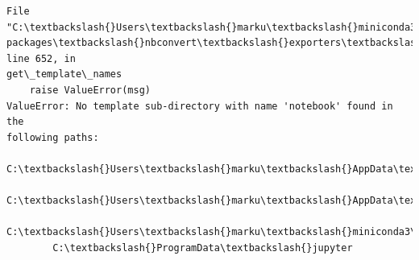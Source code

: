 \documentclass[11pt]{article}
\begin{document}
\begin{Verbatim}[commandchars=\\\{\}]
  File "C:\textbackslash{}Users\textbackslash{}marku\textbackslash{}miniconda3\textbackslash{}Lib\textbackslash{}site-
packages\textbackslash{}nbconvert\textbackslash{}exporters\textbackslash{}templateexporter.py", line 652, in
get\_template\_names
    raise ValueError(msg)
ValueError: No template sub-directory with name 'notebook' found in the
following paths:
        C:\textbackslash{}Users\textbackslash{}marku\textbackslash{}AppData\textbackslash{}Roaming\textbackslash{}jupyter
        C:\textbackslash{}Users\textbackslash{}marku\textbackslash{}AppData\textbackslash{}Roaming\textbackslash{}Python\textbackslash{}share\textbackslash{}jupyter
        C:\textbackslash{}Users\textbackslash{}marku\textbackslash{}miniconda3\textbackslash{}share\textbackslash{}jupyter
        C:\textbackslash{}ProgramData\textbackslash{}jupyter
    \end{Verbatim}


    
    
    
\end{document}
